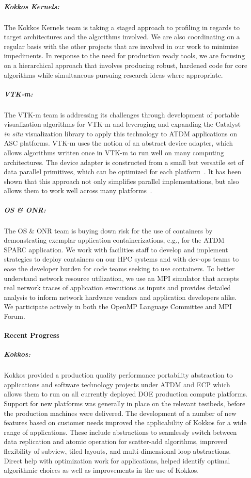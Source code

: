 \subparagraph{Kokkos Kernels:} The Kokkos Kernels team is taking a staged approach to profiling in regards to target architectures and the algorithms involved. We are also coordinating on a regular basis with the other projects that are involved in our work to minimize impediments. In response to the need for production ready tools, we are focusing on a hierarchical approach that involves producing robust, hardened code for core algorithms while simultaneous pursuing research ideas where appropriate. 
 
\subparagraph{VTK-m:} The VTK-m team is addressing its challenges through
development of portable visualization algorithms for VTK-m and leveraging and
expanding the Catalyst~\cite{Catalyst}  \emph{in situ} visualization library to
apply this technology to ATDM applications on ASC platforms.  VTK-m uses the
notion of an abstract device adapter, which allows algorithms written once in
VTK-m to run well on many computing architectures.  The device adapter is
constructed from a small but versatile set of data parallel primitives, which
can be optimized for each platform~\cite{Blelloch1990}.  It has been shown that
this approach not only simplifies parallel implementations, but also allows
them to work well across many platforms~\cite{Lo2012,Larsen2015,Moreland2015}.

\subparagraph{OS \& ONR:} The OS \& ONR team is buying down risk for the use of containers by demonstrating exemplar application containerizations, e.g., for the ATDM SPARC application.  We work with facilities staff to develop and implement strategies to deploy containers on our HPC systems and with dev-ops teams to ease the developer burden for code teams seeking to use containers.  To better understand network resource utilization, we use an MPI simulator that accepts real network traces of application executions as inputs and provides detailed analysis to inform network hardware vendors and application developers alike.  We participate actively in both the OpenMP Language Committee and MPI Forum.



\paragraph{Recent Progress}


\subparagraph{Kokkos:}  Kokkos provided a production quality performance portability abstraction to applications and software technology projects under ATDM and ECP which allows them to run on all currently deployed DOE production compute platforms. Support for new platforms was generally in place on the relevant testbeds, before the production machines were delivered.   The development of a number of new features based on customer needs improved the applicability of Kokkos for a wide range of applications. These include abstractions to seamlessly switch between data replication and atomic operation for scatter-add algorithms, improved flexibility of subview, tiled layouts, and multi-dimensional loop abstractions.  Direct help with optimization work for applications, helped identify optimal algorithmic choices as well as improvements in the use of Kokkos.


